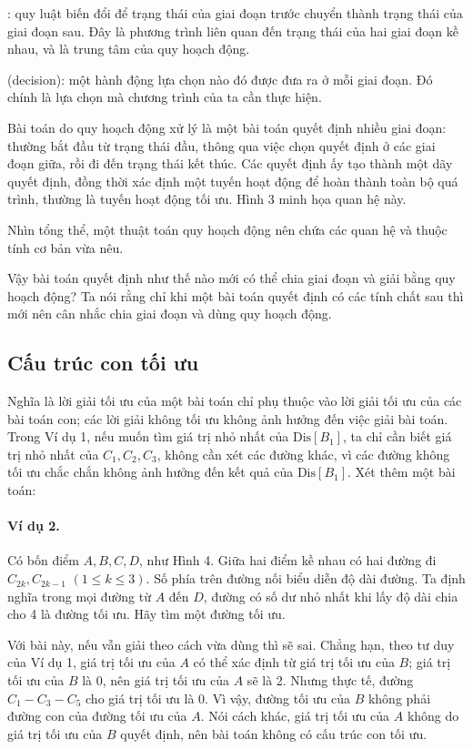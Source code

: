 \documentclass[11pt]{article}
\begin{document}
: quy luật biến đổi để trạng thái của
giai đoạn trước chuyển thành trạng thái của giai đoạn sau. Đây là phương trình
liên quan đến trạng thái của hai giai đoạn kề nhau, và là trung tâm của quy
hoạch động.

 (decision): một hành động lựa chọn nào đó được đưa ra ở mỗi
giai đoạn. Đó chính là lựa chọn mà chương trình của ta cần thực hiện.

Bài toán do quy hoạch động xử lý là một bài toán quyết định nhiều giai đoạn:
thường bắt đầu từ trạng thái đầu, thông qua việc chọn quyết định ở các giai
đoạn giữa, rồi đi đến trạng thái kết thúc. Các quyết định ấy tạo thành một
dãy quyết định, đồng thời xác định một tuyến hoạt động để hoàn thành toàn bộ
quá trình, thường là tuyến hoạt động tối ưu. Hình 3 minh họa quan hệ này.

Nhìn tổng thể, một thuật toán quy hoạch động nên chứa các quan hệ và thuộc
tính cơ bản vừa nêu.

Vậy bài toán quyết định như thế nào mới có thể chia giai đoạn và giải bằng
quy hoạch động? Ta nói rằng chỉ khi một bài toán quyết định có các tính chất
sau thì mới nên cân nhắc chia giai đoạn và dùng quy hoạch động.

\subsection{Cấu trúc con tối ưu}

Nghĩa là lời giải tối ưu của một bài toán chỉ phụ thuộc vào lời giải tối ưu
của các bài toán con; các lời giải không tối ưu không ảnh hưởng đến việc giải
bài toán. Trong Ví dụ 1, nếu muốn tìm giá trị nhỏ nhất của \(\mathrm{Dis}[B_1]\),
ta chỉ cần biết giá trị nhỏ nhất của \(C_1,C_2,C_3\), không cần xét các đường
khác, vì các đường không tối ưu chắc chắn không ảnh hưởng đến kết quả của
\(\mathrm{Dis}[B_1]\). Xét thêm một bài toán:

\paragraph{Ví dụ 2.}
Có bốn điểm \(A,B,C,D\), như Hình 4. Giữa hai điểm kề nhau có hai đường đi
\(C_{2k},C_{2k-1}\) \((1\le k\le 3)\). Số phía trên đường nối biểu diễn độ
dài đường. Ta định nghĩa trong mọi đường từ \(A\) đến \(D\), đường có số dư
nhỏ nhất khi lấy độ dài chia cho 4 là đường tối ưu. Hãy tìm một đường tối ưu.

Với bài này, nếu vẫn giải theo cách vừa dùng thì sẽ sai. Chẳng hạn, theo tư
duy của Ví dụ 1, giá trị tối ưu của \(A\) có thể xác định từ giá trị tối ưu
của \(B\); giá trị tối ưu của \(B\) là 0, nên giá trị tối ưu của \(A\) sẽ là
2. Nhưng thực tế, đường \(C_1-C_3-C_5\) cho giá trị tối ưu là 0. Vì vậy,
đường tối ưu của \(B\) không phải đường con của đường tối ưu của \(A\). Nói
cách khác, giá trị tối ưu của \(A\) không do giá trị tối ưu của \(B\) quyết
định, nên bài toán không có cấu trúc con tối ưu.
\end{document}
